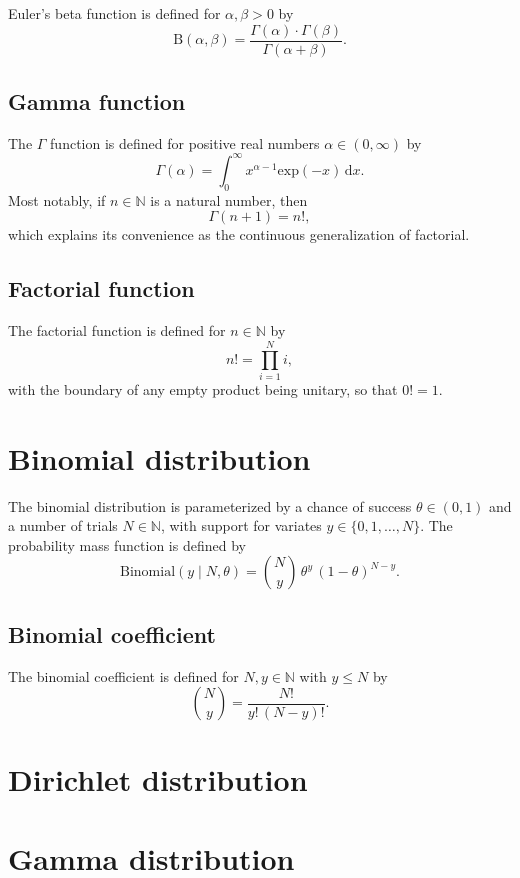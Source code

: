 \documentclass[11pt]{report}
\begin{document}
Euler's beta function is defined for $\alpha, \beta > 0$ by
\[
  \textrm{B}(\alpha, \beta)
  = \frac{\Gamma(\alpha) \cdot \Gamma(\beta)}
         {\Gamma(\alpha + \beta)}.
\]

\subsection{Gamma function}

The $\Gamma$ function is defined for positive real numbers $\alpha \in
(0, \infty)$ by
\[
  \Gamma(\alpha) = \int_0^{\infty} x^{\alpha - 1} \textrm{exp}(-x) \, \textrm{d}x.
\]
Most notably, if $n \in \mathbb{N}$ is a natural number, then
\[
  \Gamma(n + 1) = n!,
\]
which explains its convenience as the continuous generalization of
factorial.

\subsection{Factorial function}

The factorial function is defined for $n \in \mathbb{N}$ by
\[
  n! = \prod_{i = 1}^N i,
\]
with the boundary of any empty product being unitary, so that $0! =
1$.

\section{Binomial distribution}

The binomial distribution is parameterized by a chance of success
$\theta \in (0, 1)$ and a number of trials $N \in \mathbb{N}$, with
support for variates $y \in \{0, 1, \ldots, N\}$.  The probability mass
function is defined by
\[
  \textrm{Binomial}(y \mid N, \theta)
  = \binom{N}{y} \, \theta^y \, (1 - \theta)^{N - y}.
\]

\subsection{Binomial coefficient}

The binomial coefficient is defined for $N, y \in \mathbb{N}$ with $y
\leq N$ by
\[
  \binom{N}{y} = \frac{N!}{y! \, (N - y)!}.
\]

\section{Dirichlet distribution}

\section{Gamma distribution}
\end{document}
